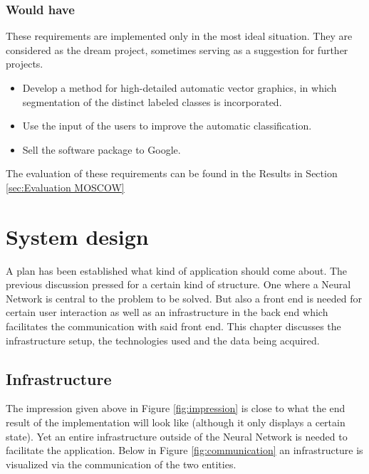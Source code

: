 \documentclass[a4paper,onecolumn]{report}
\begin{document}
\subsection{Would have}
These requirements are implemented only in the most ideal situation. They are considered as the dream project, sometimes serving as a suggestion for further projects. 

\begin{itemize}
\item Develop a method for high-detailed automatic vector graphics, in which segmentation of the distinct labeled classes is incorporated.
\item Use the input of the users to improve the automatic classification. 
\item Sell the software package to Google. 
\end{itemize}

The evaluation of these requirements can be found in the Results in Section \ref{sec:Evaluation MOSCOW}

\chapter{System design}
\label{chap:softwarearchitecture}
A plan has been established what kind of application should come about. The previous discussion pressed for a certain kind of structure. One where a Neural Network is central to the problem to be solved. But also a front end is needed for certain user interaction as well as an infrastructure in the back end which facilitates the communication with said front end. This chapter discusses the infrastructure setup, the technologies used and the data being acquired.

\section{Infrastructure}
The impression given above in Figure \ref{fig:impression} is close to what the end result of the implementation will look like (although it only displays a certain state). Yet an entire infrastructure outside of the Neural Network is needed to facilitate the application. Below in Figure \ref{fig:communication} an infrastructure is visualized via the communication of the two entities.
\end{document}
